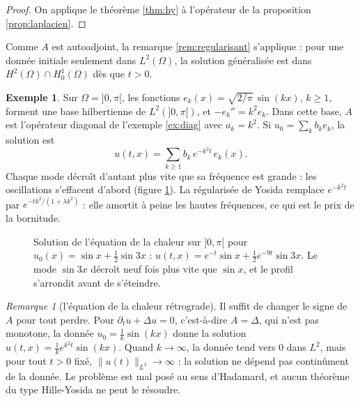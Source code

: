 \documentclass[11pt,a4paper]{article}
\theoremstyle{plain}
\theoremstyle{definition}
\newtheorem{exemple}[theoreme]{Exemple}
\theoremstyle{remark}
\newtheorem{remarque}[theoreme]{Remarque}
\begin{document}
\begin{proof}
On applique le théorème \ref{thm:hy} à l'opérateur de la proposition \ref{prop:laplacien}.
\end{proof}

Comme $A$ est autoadjoint, la remarque \ref{rem:regularisant} s'applique : pour une donnée initiale seulement dans $L^2(\Omega)$, la solution généralisée est dans $H^2(\Omega)\cap H^1_0(\Omega)$ dès que $t>0$.

\begin{exemple}\label{ex:intervalle}
Sur $\Omega=]0,\pi[$, les fonctions $e_k(x)=\sqrt{2/\pi}\,\sin(kx)$, $k\geq1$, forment une base hilbertienne de $L^2(]0,\pi[)$, et $-e_k''=k^2e_k$. Dans cette base, $A$ est l'opérateur diagonal de l'exemple \ref{ex:diag} avec $a_k=k^2$. Si $u_0=\sum_kb_ke_k$, la solution est
\[
  u(t,x)=\sum_{k\geq1}b_k\,e^{-k^2t}\,e_k(x) .
\]
Chaque mode décroît d'autant plus vite que sa fréquence est grande : les oscillations s'effacent d'abord (figure \ref{fig:chaleur}). La régularisée de Yosida remplace $e^{-k^2t}$ par $e^{-tk^2/(1+\lambda k^2)}$ : elle amortit à peine les hautes fréquences, ce qui est le prix de la bornitude.
\end{exemple}

\begin{figure}[h]
\centering
{}
\caption{Solution de l'équation de la chaleur sur $]0,\pi[$ pour $u_0(x)=\sin x+\frac12\sin3x$ : $u(t,x)=e^{-t}\sin x+\frac12e^{-9t}\sin3x$. Le mode $\sin3x$ décroît neuf fois plus vite que $\sin x$, et le profil s'arrondit avant de s'éteindre.}\label{fig:chaleur}
\end{figure}

\begin{remarque}[l'équation de la chaleur rétrograde]
Il suffit de changer le signe de $A$ pour tout perdre. Pour $\partial_tu+\Delta u=0$, c'est-à-dire $A=\Delta$, qui n'est pas monotone, la donnée $u_0=\frac1k\sin(kx)$ donne la solution $u(t,x)=\frac1ke^{k^2t}\sin(kx)$. Quand $k\to\infty$, la donnée tend vers $0$ dans $L^2$, mais pour tout $t>0$ fixé, $\|u(t)\|_{L^2}\to\infty$ : la solution ne dépend pas continûment de la donnée. Le problème est mal posé au sens d'Hadamard, et aucun théorème du type Hille-Yosida ne peut le résoudre.
\end{remarque}
\end{document}
